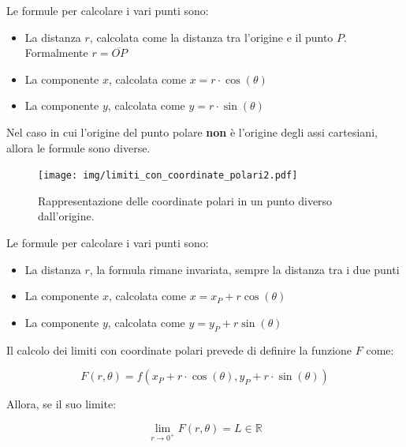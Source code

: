 \documentclass[a4paper]{article}
\begin{document}
	\noindent
	Le formule per calcolare i vari punti sono:
	
	\begin{itemize}
		\item La distanza $r$, calcolata come la distanza tra l'origine e il punto $P$. Formalmente $r = \overline{OP}$
		
		\item La componente $x$, calcolata come $x = r \cdot \cos\left(\theta\right)$
		
		\item La componente $y$, calcolata come $y = r \cdot \sin\left(\theta\right)$
	\end{itemize}

	\noindent
	Nel caso in cui l'origine del punto polare \textbf{non} è l'origine degli assi cartesiani, allora le formule sono diverse.
	
	\begin{figure}[!htp]
		\centering
		\texttt{[image: img/limiti\_con\_coordinate\_polari2.pdf]}
		\caption{Rappresentazione delle coordinate polari in un punto diverso dall'origine.}
	\end{figure}
	
	\noindent
	Le formule per calcolare i vari punti sono:
	
	\begin{itemize}
		\item La distanza $r$, la formula rimane invariata, sempre la distanza tra i due punti
		
		\item La componente $x$, calcolata come $x = x_{P} + r \cos\left(\theta\right)$
		
		\item La componente $y$, calcolata come $y = y_{P} + r \sin\left(\theta\right)$
	\end{itemize}

	\newpage
	
	\noindent
	Il calcolo dei limiti con coordinate polari prevede di definire la funzione $F$ come:
	
	\begin{equation*}
		F\left(r,\theta\right) = f\left(x_{P} + r \cdot \cos\left(\theta\right), y_{P} + r \cdot \sin\left(\theta\right)\right)
	\end{equation*}

	\noindent
	Allora, se il suo limite:
	
	\begin{equation*}
		\lim_{r \rightarrow 0^{+}} F\left(r,\theta\right) = L \in \mathbb{R}
	\end{equation*}
\end{document}
